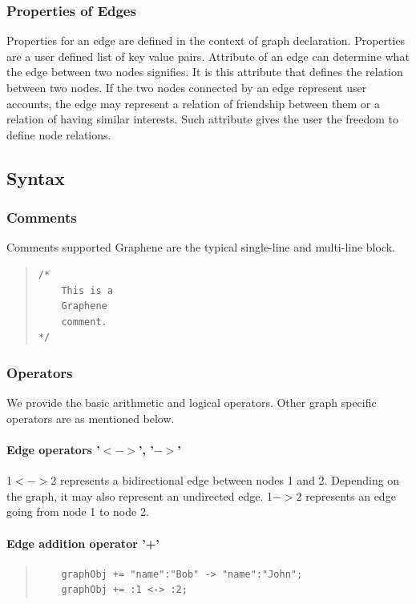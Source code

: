 \documentclass[a4paper]{article}
\begin{document}
\subsubsection{Properties of Edges}
\noindent Properties for an edge are defined in the context of graph declaration. Properties are a user defined list of key value pairs. Attribute of an edge can determine what the edge between two nodes signifies. It is this attribute that defines the relation between two nodes. If the two nodes connected by an edge represent user accounts, the edge may represent a relation of friendship between them or a relation of having similar interests. Such attribute gives the user the freedom to define node relations.

\subsection{Syntax}
\subsubsection{Comments}

Comments supported Graphene are the typical single-line and multi-line block.

\begin{quote}
\begin{verbatim}
/*
	This is a
	Graphene
	comment.
*/
\end{verbatim}
\end{quote}

\subsubsection{Operators}

We provide the basic arithmetic and logical operators. Other graph specific operators are as mentioned below.

\paragraph{Edge operators '$<->$', '$->$'}
    1$<->$2 represents a bidirectional edge between nodes 1 and 2. Depending on the graph, it may also represent an undirected edge. 1$->$2 represents an edge going from node 1 to node 2. 

\paragraph{Edge addition operator '+'}
\begin{quote}
\begin{verbatim}
	graphObj += "name":"Bob" -> "name":"John"; 
	graphObj += :1 <-> :2;
\end{verbatim}
\end{quote}
\end{document}
